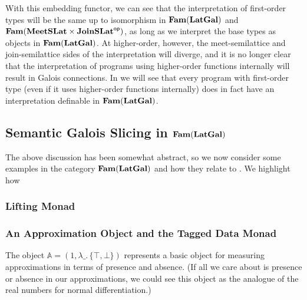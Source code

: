 With this embedding functor, we can see that the interpretation of
first-order types will be the same up to isomorphism in
$\mathbf{Fam}(\mathbf{LatGal})$ and $\mathbf{Fam}(\mathbf{MeetSLat} \times \mathbf{JoinSLat}^{\mathsf{op}})$, as long as
we interpret the base types as objects in $\mathbf{Fam}(\mathbf{LatGal})$. At
higher-order, however, the meet-semilattice and join-semilattice
sides of the interpretation will diverge, and it is no longer clear
that the interpretation of programs using higher-order functions
internally will result in Galois connections. In 
we will see that every program with first-order type (even if it uses
higher-order functions internally) does in fact have an interpretation
definable in $\mathbf{Fam}(\mathbf{LatGal})$.



\subsection{Semantic Galois Slicing in $\mathbf{Fam}(\mathbf{LatGal})$}
\label{sec:semantic-gps}

The above discussion has been somewhat abstract, so we now consider
some examples in the category $\mathbf{Fam}(\mathbf{LatGal})$ and how they relate to
\GPS. We highlight how

\subsubsection{Lifting Monad}


\subsubsection{An Approximation Object and the Tagged Data Monad}


The object $\mathbb{A} = (1, \lambda \_.\, \{\top,\bot\})$ represents
a basic object for measuring approximations in terms of presence and
absence. (If all we care about is presence or absence in our
approximations, we could see this object as the analogue of the real
numbers for normal differentiation.)

